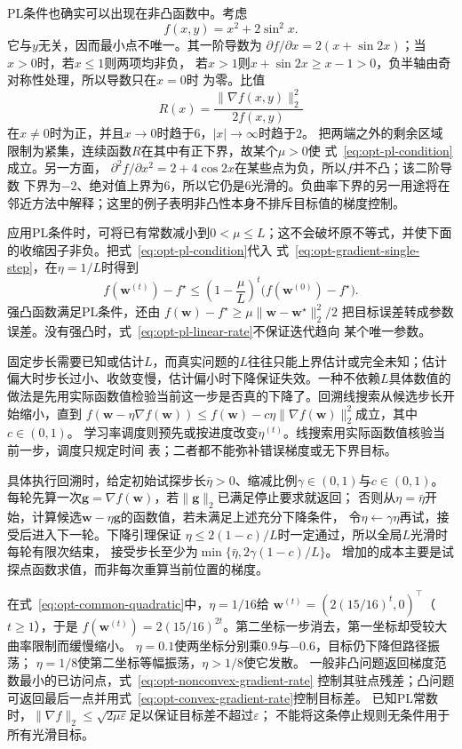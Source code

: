 PL条件也确实可以出现在非凸函数中。考虑
\[
  f(x,y)=x^2+2\sin^2x.
\]
它与$y$无关，因而最小点不唯一。其一阶导数为
$\partial f/\partial x=2(x+\sin 2x)$；当$x>0$时，若$x\leq1$则两项均非负，
若$x>1$则$x+\sin2x\geq x-1>0$，负半轴由奇对称性处理，所以导数只在$x=0$时
为零。比值
\[
  R(x)=\frac{\lVert\nabla f(x,y)\rVert_2^2}{2f(x,y)}
\]
在$x\neq0$时为正，并且$x\to0$时趋于$6$，$|x|\to\infty$时趋于$2$。
把两端之外的剩余区域限制为紧集，连续函数$R$在其中有正下界，故某个$\mu>0$使
式~\eqref{eq:opt-pl-condition}成立。另一方面，
$\partial^2 f/\partial x^2=2+4\cos2x$在某些点为负，所以$f$并不凸；该二阶导数
下界为$-2$、绝对值上界为$6$，所以它仍是$6$光滑的。负曲率下界的另一用途将在
邻近方法中解释；这里的例子表明非凸性本身不排斥目标值的梯度控制。

应用PL条件时，可将已有常数减小到$0<\mu\leq L$；这不会破坏原不等式，并使下面的收缩因子非负。把式~\eqref{eq:opt-pl-condition}代入
式~\eqref{eq:opt-gradient-single-step}，在$\eta=1/L$时得到
\begin{equation}
  f(\bm{w}^{(t)})-f^\star
  \leq
  \left(1-\frac{\mu}{L}\right)^t
  \bigl(f(\bm{w}^{(0)})-f^\star\bigr).
  \label{eq:opt-pl-linear-rate}
\end{equation}
强凸函数满足PL条件，还由
$f(\bm{w})-f^\star\geq\mu\lVert\bm{w}-\bm{w}^{\star}\rVert_2^2/2$
把目标误差转成参数误差。没有强凸时，式~\eqref{eq:opt-pl-linear-rate}不保证迭代趋向
某个唯一参数。

固定步长需要已知或估计$L$，而真实问题的$L$往往只能上界估计或完全未知；估计偏大时步长过小、收敛变慢，估计偏小时下降保证失效。一种不依赖$L$具体数值的做法是先用实际函数值检验当前这一步是否真的下降了。回溯线搜索从候选步长开始缩小，直到
$f(\bm{w}-\eta\nabla f(\bm{w}))\leq
f(\bm{w})-c\eta\lVert\nabla f(\bm{w})\rVert_2^2$成立，其中$c\in(0,1)$。
学习率调度则预先或按进度改变$\eta^{(t)}$。线搜索用实际函数值核验当前一步，调度只规定时间
表；二者都不能弥补错误梯度或无下界目标。

具体执行回溯时，给定初始试探步长$\bar\eta>0$、缩减比例$\gamma\in(0,1)$与$c\in(0,1)$。
每轮先算一次$\bm g=\nabla f(\bm w)$，若$\|\bm g\|_2$已满足停止要求就返回；
否则从$\eta=\bar\eta$开始，计算候选$\bm w-\eta\bm g$的函数值，若未满足上述充分下降条件，
令$\eta\leftarrow\gamma\eta$再试，接受后进入下一轮。下降引理保证
$\eta\leq2(1-c)/L$时一定通过，所以全局$L$光滑时每轮有限次结束，
接受步长至少为$\min\{\bar\eta,2\gamma(1-c)/L\}$。
增加的成本主要是试探点函数求值，而非每次重算当前位置的梯度。

在式~\eqref{eq:opt-common-quadratic}中，$\eta=1/16$给
$\bm w^{(t)}=(2(15/16)^t,0)^\top$（$t\geq1$），于是
$f(\bm w^{(t)})=2(15/16)^{2t}$。第二坐标一步消去，第一坐标却受较大曲率限制而缓慢缩小。
$\eta=0.1$使两坐标分别乘$0.9$与$-0.6$，目标仍下降但路径振荡；
$\eta=1/8$使第二坐标等幅振荡，$\eta>1/8$使它发散。
一般非凸问题返回梯度范数最小的已访问点，式~\eqref{eq:opt-nonconvex-gradient-rate}
控制其驻点残差；凸问题可返回最后一点并用式~\eqref{eq:opt-convex-gradient-rate}控制目标差。
已知PL常数时，$\|\nabla f\|_2\leq\sqrt{2\mu\varepsilon}$足以保证目标差不超过$\varepsilon$；
不能将这条停止规则无条件用于所有光滑目标。

